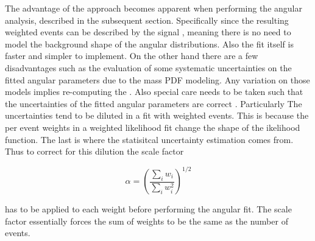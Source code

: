 The advantage of the \sWeights approach becomes apparent when performing the angular analysis, described in the subsequent section. Specifically since the resulting 
\BsJpsiKst weighted events can be described by the signal \pdf, meaning there is no need to model the background shape of the angular distributions.
Also the fit itself is faster and simpler to implement. On the other hand there are a few 
disadvantages such as the evaluation of some systematic uncertainties on the fitted angular parameters due to the mass PDF modeling.
Any variation on those models implies re-computing the \sWeights. Also special care needs to be taken such that the uncertainties
of the fitted angular parameters are correct \cite{splot}. Particularly The uncertainties tend to be diluted in a fit with weighted
events. This is because the per event weights in a weighted likelihood fit change the shape of the ikelihood function. The last is 
where the statisitcal uncertainty estimation comes from. Thus to correct for this dilution the scale factor 

\begin{equation}
\alpha = \left(\frac{\sum_{i} w_i}{\sum_{i} w_i^2}\right)^{1/2}
\label{sWeights_scale_factor}
\end{equation}

\noindent has to be applied to each weight before performing the angular fit. The scale factor essentially forces the sum of weights
to be the same as the number of events.

